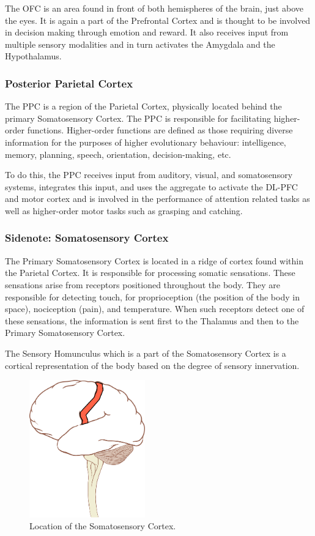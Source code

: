 \documentclass[a4paper, amsfonts, amssymb, amsmath, reprint, showkeys, nofootinbib, twoside]{revtex4-1}
\begin{document}
The OFC is an area found in front of both hemispheres of the brain, just above the
eyes. It is again a part of the Prefrontal Cortex and is thought to be involved in
decision making through emotion and reward. It also receives input from multiple
sensory modalities and in turn activates the Amygdala and the
Hypothalamus. \cite{theprefrontalcortex,ofcprimates,theorbitofrontalcortex}

\subsubsection{Posterior Parietal Cortex}
The PPC is a region of the Parietal Cortex, physically located behind the primary
Somatosensory Cortex. The PPC is responsible for facilitating higher-order
functions. Higher-order functions are defined as those requiring diverse information
for the purposes of higher evolutionary behaviour: intelligence, memory, planning,
speech, orientation, decision-making, etc.

To do this, the PPC receives input from auditory, visual, and somatosensory
systems, integrates this input, and uses the aggregate to activate the DL-PFC and motor cortex and is
involved in the performance of attention related tasks as well as higher-order motor
tasks such as grasping and catching. \cite{parietallobesa,parietallobes}

\subsubsection{Sidenote: Somatosensory Cortex}
The Primary Somatosensory Cortex is located in a ridge of cortex found within the Parietal Cortex.
It is responsible for processing somatic sensations. These sensations arise from receptors
positioned throughout the body. They are responsible for detecting touch, for proprioception
(the position of the body in space), nociception (pain), and temperature. \cite{somato}
When such receptors detect one of these sensations, the information is sent first to
the Thalamus and then to the Primary Somatosensory Cortex.

The Sensory Homunculus which is a part of the Somatosensory Cortex is a cortical representation
of the body based on the degree of sensory innervation. \cite{sensoryhom}

\begin{figure}[H]
  \centering
  \includegraphics[width=5cm]{images/side-somatosensory.png}
  \caption{Location of the Somatosensory Cortex.}
  \label{fig:side-somatosensory}
\end{figure}
\end{document}
